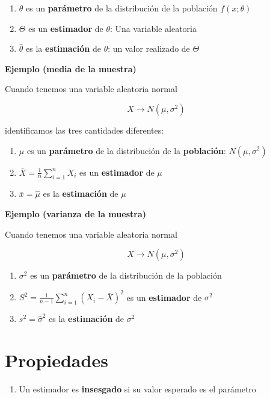 \documentclass[
]{book}
\providecommand{\tightlist}{%
  \setlength{\itemsep}{0pt}\setlength{\parskip}{0pt}}
\begin{document}
\begin{enumerate}
\def\labelenumi{\arabic{enumi}.}
\tightlist
\item
  \(\theta\) es un \textbf{parámetro} de la distribución de la población \(f(x; \theta)\)
\item
  \(\Theta\) es un \textbf{estimador} de \(\theta\): Una variable aleatoria
\item
  \(\hat{\theta}\) es la \textbf{estimación} de \(\theta\): un valor realizado de \(\Theta\)
\end{enumerate}

\textbf{Ejemplo (media de la muestra)}

Cuando tenemos una variable aleatoria normal

\[X \rightarrow N(\mu, \sigma^2)\]

identificamos las tres cantidades diferentes:

\begin{enumerate}
\def\labelenumi{\arabic{enumi}.}
\tightlist
\item
  \(\mu\) es un \textbf{parámetro} de la distribución de la \textbf{población}: \(N(\mu, \sigma^2)\)
\item
  \(\bar{X}=\frac{1}{n} \sum_{i=1}^n X_i\) es un \textbf{estimador} de \(\mu\)
\item
  \(\bar{x}=\hat{\mu}\) es la \textbf{estimación} de \(\mu\)
\end{enumerate}

\textbf{Ejemplo (varianza de la muestra)}

Cuando tenemos una variable aleatoria normal

\[X \rightarrow N(\mu, \sigma^2)\]

\begin{enumerate}
\def\labelenumi{\arabic{enumi}.}
\tightlist
\item
  \(\sigma^2\) es un \textbf{parámetro} de la distribución de la población
\item
  \(S^2=\frac{1}{n-1} \sum_{i=1}^n (X_i-\bar{X})^2\) es un \textbf{estimador} de \(\sigma^2\)
\item
  \(s^2=\hat{\sigma}^2\) es la \textbf{estimación} de \(\sigma^2\)
\end{enumerate}

\hypertarget{propiedades}{%
\section{Propiedades}\label{propiedades}}

\begin{enumerate}
\def\labelenumi{\arabic{enumi}.}
\tightlist
\item
  Un estimador es \textbf{insesgado} si su valor esperado es el parámetro
\end{enumerate}
\end{document}

